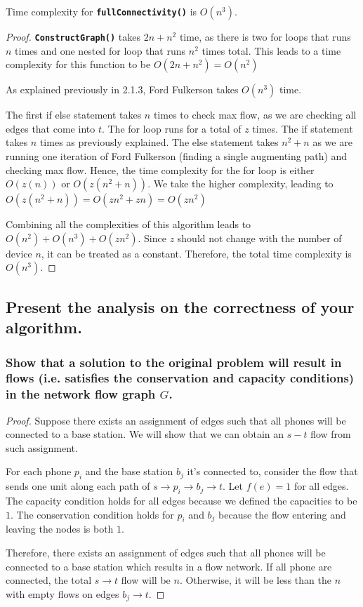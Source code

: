 \documentclass[11pt]{scrartcl}
\newcommand{\FuncCall}[2]{\texttt{\bfseries #1(#2)}}
\begin{document}
Time complexity for \FuncCall{fullConnectivity}{} is $O(n^3)$.
\begin{proof}
	\FuncCall{ConstructGraph}{} takes $2n + n^2$ time, as there is two for loops that runs $n$ times and 
one nested for loop that runs $n^2$ times total. This leads to a time complexity for this function to be $O(2n + n^2) = O(n^2)$

As explained previously in 2.1.3, Ford Fulkerson takes $O(n^3)$ time. 

The first if else statement takes $n$ times to check max flow, as we are checking all edges that come into $t$. 
The for loop runs for a total of $z$ times. The if statement takes $n$ times as previously explained.
The else statement takes $n^2 + n$ as we are running one iteration of Ford Fulkerson (finding a single augmenting path)
and checking max flow. Hence, the time complexity for the for loop is either $O(z(n))$ or $O(z(n^2 + n))$. We take the 
higher complexity, leading to $O(z(n^2 + n)) = O(zn^2 + zn) = O(zn^2)$

Combining all the complexities of this algorithm leads to $O(n^2) + O(n^3) + O(zn^2)$. 
Since $z$ should not change with the number of device $n$, it can be treated as a constant.
Therefore, the total time complexity is $O(n^3)$.
\end{proof}

\subsection{
	Present the analysis on the correctness of your algorithm.
}

\subsubsection{
	Show that a solution to the original problem will result in flows (i.e. satisfies
	the conservation and capacity conditions) in the network flow graph $G$.
}
\begin{proof}
	Suppose there exists an assignment of edges such that all phones will be connected to a base station.
	We will show that we can obtain an $s-t$ flow from such assignment.

	For each phone $p_i$ and the base station $b_j$ it's connected to, consider the flow that sends one unit
	along each path of $s \rightarrow p_i \rightarrow b_j \rightarrow t$. Let $f(e)=1$ for all edges.
	The capacity condition holds for all edges because we defined the capacities to be $1$.
	The conservation condition holds for $p_i$ and $b_j$ because the flow entering and leaving the nodes is both $1$.

	Therefore, there exists an assignment of edges such that all phones will be connected to a base station
	which results in a flow network. If all phone are connected, the total $s \rightarrow t$ flow
	will be $n$. Otherwise, it will be less than the $n$ with empty flows on edges $b_j \rightarrow t$.
\end{proof}
\end{document}
